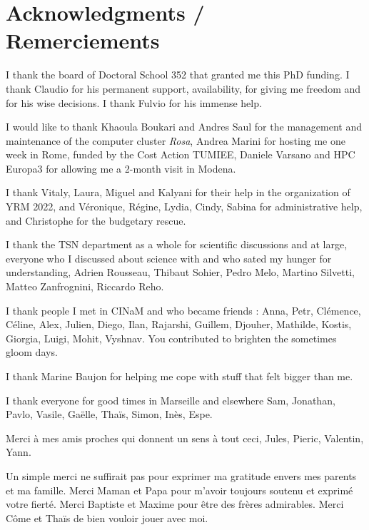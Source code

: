 \chapter*{Acknowledgments / Remerciements}

I thank the board of Doctoral School 352 that granted me this PhD funding. 
I thank Claudio for his permanent support, availability, for giving me freedom and for his wise decisions. I thank Fulvio for his immense help.

I would like to thank Khaoula Boukari and Andres Saul for the management and maintenance of the computer cluster \textit{Rosa},  
Andrea Marini for hosting me one week in Rome, funded by the Cost Action TUMIEE, Daniele Varsano and HPC Europa3 for allowing me a 2-month visit in Modena.

I thank Vitaly, Laura, Miguel and Kalyani for their help in the organization of YRM 2022, and Véronique, Régine, Lydia, Cindy, Sabina for administrative help, and Christophe for the budgetary rescue.

I thank the TSN department as a whole for scientific discussions and at large, everyone who I discussed about science with and who sated my hunger for understanding, Adrien Rousseau, Thibaut Sohier, Pedro Melo, Martino Silvetti, Matteo Zanfrognini, Riccardo Reho.

I thank people I met in CINaM and who became friends : Anna, Petr, Clémence, Céline, Alex, Julien, Diego, Ilan, Rajarshi, Guillem, Djouher, Mathilde, Kostis, Giorgia, Luigi,  Mohit, Vyshnav. You contributed to brighten the sometimes gloom days. 


I thank Marine Baujon for helping me cope with stuff that felt bigger than me.

I thank everyone for good times in Marseille and elsewhere Sam, Jonathan, Pavlo, Vasile, Gaëlle, Thaïs, Simon, Inès, Espe.

Merci à mes amis proches qui donnent un sens à tout ceci, Jules, Pieric, Valentin, Yann.

Un simple merci ne suffirait pas pour exprimer ma gratitude envers mes parents et ma famille. Merci Maman et Papa pour m'avoir toujours soutenu et exprimé votre fierté. Merci Baptiste et Maxime pour être des frères admirables. Merci Côme et Thaïs de bien vouloir jouer avec moi.